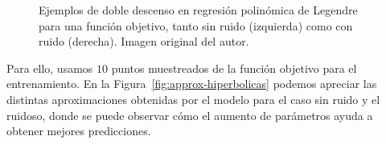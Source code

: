 \begin{figure}[h]
\begin{minipage}{0.4\textwidth}
    \end{minipage}
    \caption[Ejemplos de doble descenso en regresión polinómica de Legendre para una función objetivo, tanto con ruido como sin ruido.]{Ejemplos de doble descenso en regresión polinómica de Legendre para una función objetivo, tanto sin ruido (izquierda) como con ruido (derecha). Imagen original del autor.}\label{fig:legendrehyperbolicDD}
\end{figure}

Para ello, usamos $10$ puntos muestreados de la función objetivo para el entrenamiento. En la Figura~\ref{fig:approx-hiperbolicas} podemos apreciar las distintas aproximaciones obtenidas por el modelo para el caso sin ruido y el ruidoso, donde se puede observar cómo el aumento de parámetros ayuda a obtener mejores predicciones.\newline

